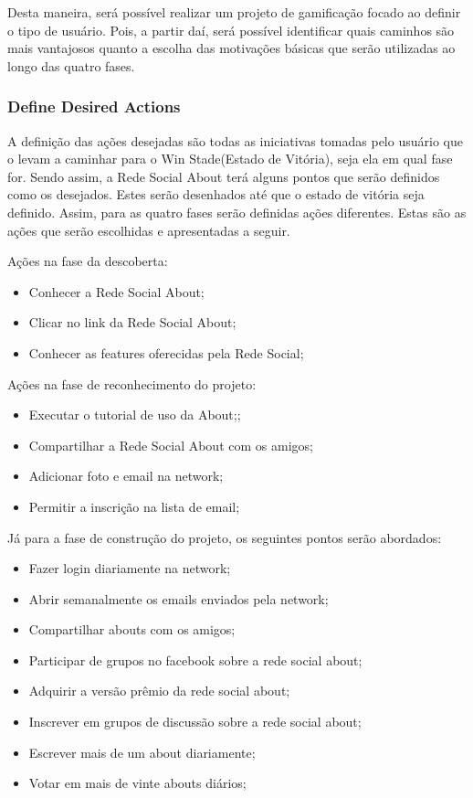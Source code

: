 Desta maneira, será possível realizar um projeto de gamificação focado ao definir o tipo
de usuário. Pois, a partir daí, será possível identificar quais caminhos são mais vantajosos
quanto a escolha das motivações básicas que serão utilizadas ao longo das quatro fases.

\subsubsection{Define Desired Actions}
\label{sub:define_desired_actions}
A definição das ações desejadas são todas as iniciativas tomadas pelo usuário que o 
levam a caminhar para
o Win Stade(Estado de Vitória), seja ela em qual fase for. Sendo assim, a Rede Social
About terá alguns pontos que serão definidos como os desejados. Estes serão desenhados
até que o estado de vitória seja definido. Assim, para as quatro fases serão definidas
ações diferentes. Estas são as  ações que serão escolhidas e apresentadas
a seguir.

Ações na fase da descoberta:
\begin{itemize}
    \item Conhecer a Rede Social About;
    \item Clicar no link da Rede Social About;
    \item Conhecer as features oferecidas pela Rede Social;
\end{itemize}


Ações na fase de reconhecimento do projeto: 
\begin{itemize}
    \item Executar o tutorial de uso da About;;
    \item Compartilhar a Rede Social About com os amigos;
    \item Adicionar foto e email na network;
    \item Permitir a inscrição na lista de email;
\end{itemize}

Já para a fase de construção do projeto, os seguintes pontos serão
abordados:

\begin{itemize}
    \item Fazer login diariamente na network;
    \item Abrir semanalmente os emails enviados pela network;
    \item Compartilhar abouts com os amigos;
    \item Participar de grupos no facebook sobre a rede social about;
    \item Adquirir a versão prêmio da rede social about;
    \item Inscrever em grupos de discussão sobre a rede social about;
    \item Escrever mais de um about diariamente;
    \item Votar em mais de vinte abouts diários;
\end{itemize}

